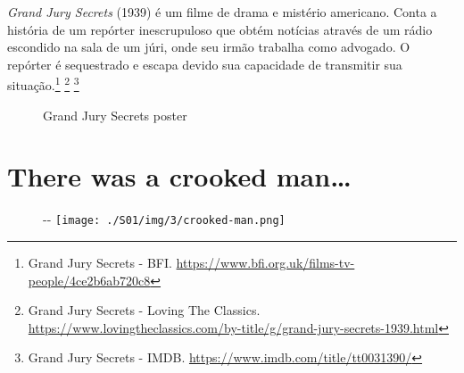 \saveparinfos
\noindent
\begin{minipage}[c]{0.5\textwidth}\useparinfo

\emph{Grand Jury Secrets} (1939) é um filme de drama e mistério
americano. Conta a história de um repórter inescrupuloso que obtém
notícias através de um rádio escondido na sala de um júri, onde seu
irmão trabalha como advogado. O repórter é sequestrado e escapa devido
sua capacidade de transmitir sua situação.\footnote{\sloppy Grand Jury Secrets - BFI. \url{https://www.bfi.org.uk/films-tv-people/4ce2b6ab720c8}}
\footnote{\sloppy Grand Jury Secrets - Loving The Classics. \url{https://www.lovingtheclassics.com/by-title/g/grand-jury-secrets-1939.html}}
\footnote{\sloppy Grand Jury Secrets - IMDB. \url{https://www.imdb.com/title/tt0031390/}}

\end{minipage}\hfill
\begin{minipage}[c]{0.5\textwidth}

\begin{figure}
  \centering
    \caption{Grand Jury Secrets poster\label{fig:grand-jury-secrets-poster}}
\end{figure}

\end{minipage}

\hypertarget{there-was-a-crooked-man}{%
\section{There was a crooked
man\ldots{}}\label{there-was-a-crooked-man}}

\begin{figure}[!ht]
  \begin{adjustwidth}{-\oddsidemargin-1in}{-\rightmargin}
    \centering
    \texttt{[image: ./S01/img/3/crooked-man.png]}
  \end{adjustwidth}
\end{figure}

